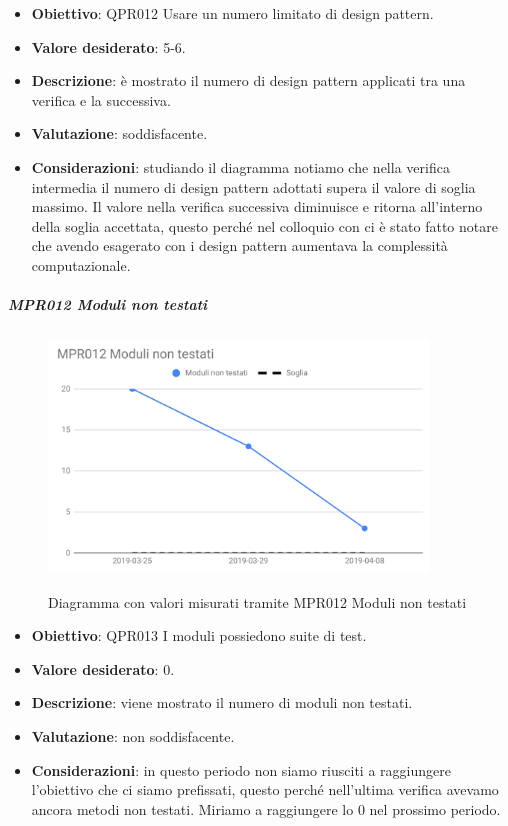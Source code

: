	\begin{itemize}
		\item \textbf{Obiettivo}: QPR012 Usare un numero limitato di design pattern.
		\item \textbf{Valore desiderato}: 5-6.
		\item \textbf{Descrizione}: è mostrato il numero di design pattern applicati tra una verifica e la successiva.
		\item \textbf{Valutazione}: soddisfacente.
		\item \textbf{Considerazioni}: studiando il diagramma notiamo che nella verifica intermedia il numero di design
		pattern adottati supera il valore di soglia massimo. Il valore nella verifica successiva diminuisce e ritorna
		all'interno della soglia accettata, questo perché nel colloquio con \RC ci è stato fatto notare che avendo
		esagerato con i design pattern aumentava la complessità computazionale.
	\end{itemize}

		\subparagraph{MPR012 Moduli non testati}
	
	\begin{figure}[H]
		\centering
		\includegraphics[width=0.9\textwidth]{img/cruscotti/RQ/MPR012.png}
		\label{immagineModuliNonTestatiRQ}
		\caption{Diagramma con valori misurati tramite MPR012 Moduli non testati}
	\end{figure}
	
	\begin{itemize}
		\item \textbf{Obiettivo}: QPR013 I moduli possiedono suite di test.
		\item \textbf{Valore desiderato}: 0.
		\item \textbf{Descrizione}: viene mostrato il numero di moduli non testati.
		\item \textbf{Valutazione}: non soddisfacente.
		\item \textbf{Considerazioni}: in questo periodo non siamo riusciti a raggiungere l'obiettivo che ci siamo prefissati, questo perché nell'ultima verifica avevamo ancora metodi non testati. Miriamo a raggiungere lo 0 nel prossimo periodo.
	\end{itemize}
	
